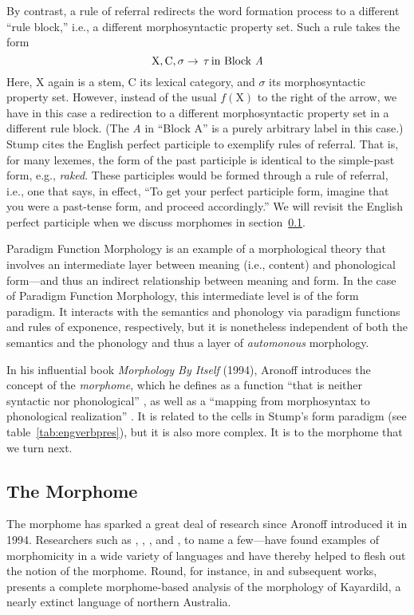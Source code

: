 By contrast, a rule of referral redirects the word formation process to a different ``rule block,'' i.e.,
a different morphosyntactic property set. Such a rule takes the form 
\begin{equation}
\label{eq:ror}
\text{X}, \text{C}, \sigma \to \, \tau \, \text{in Block \textit{A}}
\end{equation}
Here, X again is a stem, 
C its lexical category, and $\sigma$ its morphosyntactic property set. However, instead of the usual $f(\text{X})$ 
to the right of the arrow, we have in this case a redirection to a 
different morphosyntactic property set in a different rule block. (The \textit{A} in ``Block A'' 
is a purely arbitrary label in this case.) Stump cites the English perfect participle 
to exemplify rules of referral. That is, for many lexemes, the form of the 
past participle is identical to the simple-past form, e.g., \textit{raked}. 
These participles would be formed through a rule of referral, i.e., one that 
says, in effect, ``To get your perfect participle form, imagine that you 
were a past-tense form, and proceed accordingly.''  We will revisit the English 
perfect participle when we discuss morphomes 
in section~\ref{sec:the-morphome}.

Paradigm Function Morphology is an example of a morphological theory that involves an intermediate layer between
meaning (i.e., content) and phonological form---and thus an indirect relationship between
meaning and form. In the case of Paradigm Function Morphology, this intermediate
level is of the form paradigm. It interacts with the semantics and phonology 
via paradigm functions and rules of exponence, respectively,
but it is nonetheless independent of both the semantics and the phonology and thus a layer of \emph{automonous} morphology.  

In his influential book \textit{Morphology By Itself} (1994), Aronoff 
introduces the concept of the \emph{morphome}, which he
defines as a function ``that is neither 
syntactic nor phonological'' \cite[][p. 25]{aronoff:1994},
as well as a
``mapping from morphosyntax to phonological realization'' \citep[][p. 25]{aronoff:1994}. 
It is related
to the cells in Stump's form paradigm (see table~\ref{tab:engverbpres}), 
but it is also more complex. It is to the morphome that we turn next.

\subsection{The Morphome}
\label{sec:the-morphome}
The morphome has sparked a 
great deal of research since Aronoff introduced it in 1994. Researchers
such as \citet{maiden:2005, maiden:md:2016}, \citet{round:2009, round:2011, 
round:2012, round:2015, round:md:2016}, \citet{oneill:2014b,oneill:2018}, and \citet{bonami:2008, bonami:2010}, to name 
a few---have found examples of morphomicity in a wide variety of 
languages and have thereby helped to flesh out the notion of the morphome.
Round, for instance, in \citet{round:2009} and subsequent works, 
presents a complete morphome-based analysis of the morphology of 
Kayardild, a nearly extinct language of northern Australia. 


